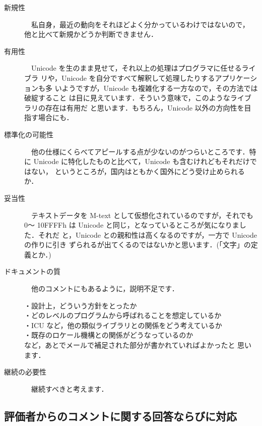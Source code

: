 \begin{description}

\item[新規性]

　私自身，最近の動向をそれほどよく分かっているわけではないので，
他と比べて新規かどうか判断できません．

\item[有用性]

　Unicode を生のまま見せて，それ以上の処理はプログラマに任せるライブラ
リや，Unicode を自分ですべて解釈して処理したりするアプリケーションも多
いようですが，Unicode も複雑化する一方なので，その方法では破綻すること
は目に見えています．そういう意味で，このようなライブラリの存在は有用だ
と思います．もちろん，Unicode 以外の方向性を目指す場合にも．

\item[標準化の可能性]

　他の仕様にくらべてアピールする点が少ないのがつらいところです．特に 
Unicode に特化したものと比べて，Unicode も含むけれどもそれだけではない，
というところが，国内はともかく国外にどう受け止められるか．

\item[妥当性]

　テキストデータを M-text として仮想化されているのですが，それでも 0〜
10FFFFh は Unicode と同じ，となっているところが気になりました．それだ
と，Unicode との親和性は高くなるのですが，一方で Unicode の作りに引き
ずられるが出てくるのではないかと思います．(「文字」の定義とか．)

\item[ドキュメントの質]

　他のコメントにもあるように，説明不足です．

・設計上，どういう方針をとったか\\
・どのレベルのプログラムから呼ばれることを想定しているか\\
・ICU など，他の類似ライブラリとの関係をどう考えているか\\
・既存のロケール機構との関係がどうなっているのか\\

など，あとでメールで補足された部分が書かれていればよかったと
思います．

\item[継続の必要性]

　継続すべきと考えます．
\end{description}


\subsection{評価者からのコメントに関する回答ならびに対応}

